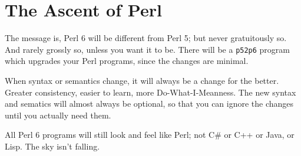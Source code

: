 \documentclass{article}
\begin{document}
\section{The Ascent of Perl}
The message is, Perl 6 will be different from Perl 5; but never
gratuitously so.  And rarely grossly so, unless you want it to be.
There will be a \verb'p52p6' program which upgrades your Perl programs,
since the changes are minimal.

When syntax or semantics change, it will always be a change for the
better.  Greater consistency, easier to learn, more Do-What-I-Meanness.
The new syntax and sematics will almost always be optional, so that you
can ignore the changes until you actually need them.

All Perl 6 programs will still look and feel like Perl; not C\# or C++ or
Java, or Lisp.  The sky isn't falling.
\end{document}
